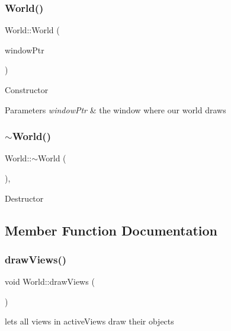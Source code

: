 \subsubsection{\texorpdfstring{World()}{World()}}
{\footnotesize\ttfamily World\+::\+World (\begin{DoxyParamCaption}\item[{std\+::shared\+\_\+ptr$<$ sf\+::\+Render\+Window $>$}]{window\+Ptr }\end{DoxyParamCaption})\hspace{0.3cm}{\ttfamily [explicit]}}

Constructor 
\begin{DoxyParams}{Parameters}
{\em window\+Ptr} & the window where our world draws \\
\hline
\end{DoxyParams}
\mbox{\label{classWorld_adf5e8724afb4d083e566ee4e48905bf2}} 
\subsubsection{\texorpdfstring{$\sim$\+World()}{~World()}}
{\footnotesize\ttfamily World\+::$\sim$\+World (\begin{DoxyParamCaption}{ }\end{DoxyParamCaption})\hspace{0.3cm}{\ttfamily [override]}, {\ttfamily [default]}}

Destructor 

\subsection{Member Function Documentation}
\mbox{\label{classWorld_a8e8ad60668f8fe975f03bcb612264bc4}} 
\subsubsection{\texorpdfstring{draw\+Views()}{drawViews()}}
{\footnotesize\ttfamily void World\+::draw\+Views (\begin{DoxyParamCaption}{ }\end{DoxyParamCaption})}

lets all views in active\+Views draw their objects \mbox{\label{classWorld_ad37fe32cce284282361b9e7397b27a23}} 
